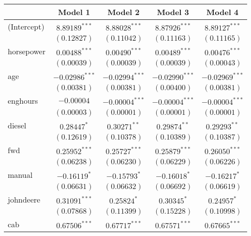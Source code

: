 
\begin{table}
\begin{center}
\begin{tabular}{l c c c c}
\hline
 & Model 1 & Model 2 & Model 3 & Model 4 \\
\hline
(Intercept)          & $8.89189^{***}$  & $8.88028^{***}$  & $8.87926^{***}$  & $8.89127^{***}$  \\
                     & $(0.12827)$      & $(0.11042)$      & $(0.11163)$      & $(0.11165)$      \\
horsepower           & $0.00488^{***}$  & $0.00490^{***}$  & $0.00489^{***}$  & $0.00476^{***}$  \\
                     & $(0.00039)$      & $(0.00039)$      & $(0.00039)$      & $(0.00043)$      \\
age                  & $-0.02986^{***}$ & $-0.02994^{***}$ & $-0.02990^{***}$ & $-0.02969^{***}$ \\
                     & $(0.00381)$      & $(0.00381)$      & $(0.00400)$      & $(0.00381)$      \\
enghours             & $-0.00004$       & $-0.00004^{***}$ & $-0.00004^{***}$ & $-0.00004^{***}$ \\
                     & $(0.00003)$      & $(0.00001)$      & $(0.00001)$      & $(0.00001)$      \\
diesel               & $0.28447^{*}$    & $0.30271^{**}$   & $0.29874^{**}$   & $0.29293^{**}$   \\
                     & $(0.12619)$      & $(0.10378)$      & $(0.10389)$      & $(0.10387)$      \\
fwd                  & $0.25952^{***}$  & $0.25727^{***}$  & $0.25879^{***}$  & $0.26050^{***}$  \\
                     & $(0.06238)$      & $(0.06230)$      & $(0.06229)$      & $(0.06226)$      \\
manual               & $-0.16119^{*}$   & $-0.15793^{*}$   & $-0.16018^{*}$   & $-0.16217^{*}$   \\
                     & $(0.06631)$      & $(0.06632)$      & $(0.06692)$      & $(0.06619)$      \\
johndeere            & $0.31091^{***}$  & $0.25824^{*}$    & $0.30345^{*}$    & $0.24957^{*}$    \\
                     & $(0.07868)$      & $(0.11399)$      & $(0.15228)$      & $(0.10998)$      \\
cab                  & $0.67506^{***}$  & $0.67717^{***}$  & $0.67571^{***}$  & $0.67665^{***}$  \\

\end{tabular}
\end{center}
\end{table}
